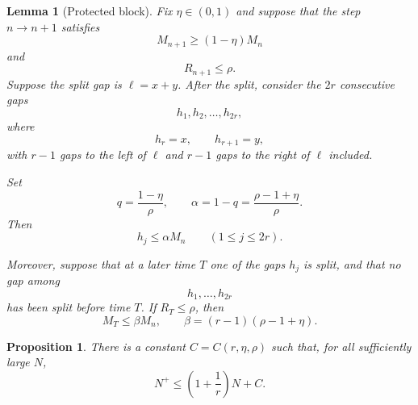 \documentclass[10pt,a4paper]{amsart}
\newtheorem{lemma}{Lemma}
\newtheorem{proposition}{Proposition}
\begin{document}
\begin{lemma}[Protected block]\label{lem:protected-block}
Fix $\eta\in(0,1)$ and suppose that the step $n\to n+1$ satisfies
\[
    M_{n+1}\geq (1-\eta)M_n
\]
and
\[
    R_{n+1}\leq \rho.
\]
Suppose the split gap is $\ell=x+y$. After the split, consider the $2r$ consecutive gaps
\[
    h_1,h_2,\ldots,h_{2r},
\]
where
\[
    h_r=x,\qquad h_{r+1}=y,
\]
with $r-1$ gaps to the left of $\ell$ and $r-1$ gaps to the right of $\ell$ included.

\bigskip
\noindent
Set
\[
    q=\frac{1-\eta}{\rho},
    \qquad
    \alpha=1-q=\frac{\rho-1+\eta}{\rho}.
\]
Then
\[
    h_j\leq \alpha M_n
    \qquad (1\leq j\leq 2r).      \tag{3.1}\label{eq:gap-bound}
\]

\smallskip
\noindent
Moreover, suppose that at a later time $T$ one of the gaps $h_j$ is split, and that no gap among
\[
    h_1,\ldots,h_{2r}
\]
has been split before time $T$. If $R_T\leq \rho$, then
\[
    M_T\leq \beta M_n,
    \qquad
    \beta=(r-1)(\rho-1+\eta).       \tag{3.2}\label{eq:release-factor}
\]
\end{lemma}

\begin{proposition}\label{prop:epoch}
There is a constant $C=C(r,\eta,\rho)$ such that, for all sufficiently large $N$,
\[
    N^+\leq \left(1+\frac1r\right)N+C .
\]
\end{proposition}
\end{document}
